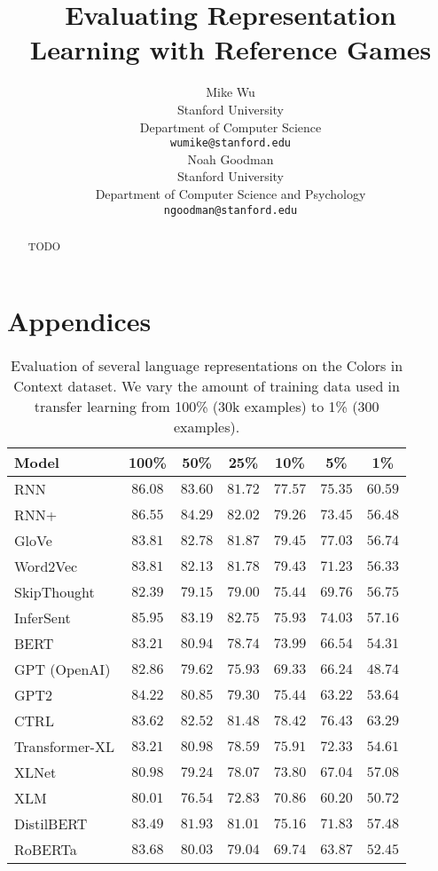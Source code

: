 \documentclass[11pt,a4paper]{article}
\title{Evaluating Representation Learning with Reference Games}
\author{Mike Wu \\
  Stanford University \\
  Department of Computer Science \\
  \texttt{wumike@stanford.edu} \\ \And
  Noah Goodman \\
  Stanford University \\
  Department of Computer Science and Psychology \\
  \texttt{ngoodman@stanford.edu} \\}
\date{}
\begin{document}
\maketitle
\begin{abstract}
TODO
\end{abstract}




\appendix

\section{Appendices}
\label{sec:appendix}

\begin{table*}[t!]
\centering
\begin{tabular}{lcccccc}
\hline
\textbf{Model} & \textbf{100\%} & \textbf{50\%} & \textbf{25\%} & \textbf{10\%} & \textbf{5\%} & \textbf{1\%} \\
\hline
RNN & $86.08$ & $83.60$ & $81.72$ & $77.57$ & $75.35$ & $60.59$ \\
RNN+ & $\mathbf{86.55}$ & $\mathbf{84.29}$ & $82.02$ & $79.26$ & $73.45$ & $56.48$ \\
GloVe & $83.81$ & $82.78$ & $81.87$ & $\mathbf{79.45}$ & $\mathbf{77.03}$ & $56.74$ \\
Word2Vec & $83.81$ & $82.13$ & $81.78$ & $79.43$ & $71.23$ & $56.33$ \\
SkipThought & $82.39$ & $79.15$ & $79.00$ & $75.44$ & $69.76$ & $56.75$ \\
InferSent & $85.95$ & $83.19$ & $\mathbf{82.75}$ & $75.93$ & $74.03$ & $57.16$ \\
BERT & $83.21$ & $80.94$ & $78.74$ & $73.99$ & $66.54$ & $54.31$ \\
GPT (OpenAI) & $82.86$ & $79.62$ & $75.93$ & $69.33$ & $66.24$ & $48.74$ \\
GPT2 & $84.22$ & $80.85$ & $79.30$ & $75.44$ & $63.22$ & $53.64$ \\
CTRL & $83.62$ & $82.52$ & $81.48$ & $78.42$ & $76.43$ & $\mathbf{63.29}$ \\
Transformer-XL & $83.21$ & $80.98$ & $78.59$ & $75.91$ & $72.33$ & $54.61$ \\
XLNet & $80.98$ & $79.24$ & $78.07$ & $73.80$ & $67.04$ & $57.08$ \\
XLM & $80.01$ & $76.54$ & $72.83$ & $70.86$ & $60.20$ & $50.72$ \\
DistilBERT & $83.49$ & $81.93$ & $81.01$ & $75.16$ & $71.83$ & $57.48$ \\
RoBERTa & $83.68$ & $80.03$ & $79.04$ & $69.74$ & $63.87$ & $52.45$ \\
\hline
\end{tabular}
\caption{\label{table:colors} Evaluation of several language representations on the Colors in Context dataset. We vary the amount of training data used in transfer learning from 100\% (30k examples) to 1\% (300 examples).}
\end{table*}
\end{document}
